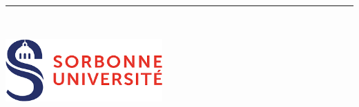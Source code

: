 
%
\begin{titlepage}
	\flushright
	\hfill
	\vfill
	{\LARGE\thesisTitle \par}
	\rule[5pt]{\textwidth}{.4pt} \par
	{\Large\thesisName}
	\vfill
	\textit{\large\thesisDate} \\
\end{titlepage}


\begin{titlepage}
	\tgherosfont
	\centering

	\includegraphics[width=6cm]{gfx/SU-logo.png} \\[2mm]
	\textsf{\thesisSubject} \\
	\textsf{\thesisUniversityInstitute} \\
	\textsf{\thesisUniversityDepartment} \\
	\textsf{\thesisUniversityCollegium}


	\vfill

	{\selectfont 
		{\huge \color{ctcolortitle}{\thesisTitle} \\[10mm]}
		{\Large \thesisName} \\
	}

	\vfill

	



\end{titlepage}
